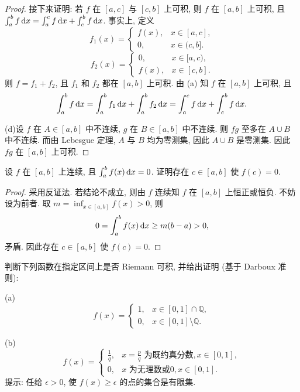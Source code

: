 ﻿\documentclass{article}
\begin{document}
\begin{proof}
  接下来证明: 若 \( f \) 在 \( [a, c] \) 与 \( [c, b] \) 上可积, 则 \( f \) 在 \( [a, b] \) 上可积, 且 \( \int_a^b f \,\mathrm{d} x = \int_a^c f \,\mathrm{d} x + \int_c^b f \,\mathrm{d} x \). 事实上, 定义
  \[ f_1(x) = \begin{cases} f(x), & x \in [a, c], \\ 0, & x \in (c, b]. \end{cases} \]
  \[ f_2(x) = \begin{cases} 0, & x \in [a, c), \\ f(x), & x \in [c, b]. \end{cases} \]
  则 \( f = f_1 + f_2 \), 且 \( f_1 \) 和 \( f_2 \) 都在 \( [a, b] \) 上可积. 由 (a) 知 \( f \) 在 \( [a, b] \) 上可积, 且
  \[ \int_a^b f \,\mathrm{d} x = \int_a^b f_1 \,\mathrm{d} x + \int_a^b f_2 \,\mathrm{d} x = \int_a^c f \,\mathrm{d} x + \int_c^b f \,\mathrm{d} x. \]

  (d)设 \( f \) 在 \( A\in [a,b] \) 中不连续, \( g \) 在 \( B\in [a,b] \) 中不连续. 则 \( fg \) 至多在 \( A\cup B \) 中不连续. 而由 Lebesgue 定理, \( A \) 与 \( B \) 均为零测集, 因此 \( A\cup B \) 是零测集. 因此 \( fg \) 在 \( [a,b] \) 上可积.
\end{proof}



\begin{problem}
设 $f$ 在 $[a, b]$ 上连续, 且 $\int_a^b f(x) \,\mathrm{d} x = 0$. 证明存在 $c \in [a, b]$ 使 $f(c) = 0$.
\end{problem}

\begin{proof}
  采用反证法. 若结论不成立, 则由 \( f \) 连续知 \( f \) 在 \( [a,b] \) 上恒正或恒负. 不妨设为前者. 取 \( m=\inf_{x\in[a,b]}f(x)>0 \), 则
  \[ 0=\int_a^b f(x)\,\mathrm{d} x\ge m(b-a)>0, \]
  矛盾. 因此存在 \( c \in [a, b] \) 使 \( f(c) = 0 \).
\end{proof}



\begin{problem}
判断下列函数在指定区间上是否 Riemann 可积, 并给出证明 (基于 Darboux 准则):

(a) 
\[ 
f(x) = \begin{cases} 1, & x \in [0, 1] \cap \mathbb{Q}, \\ 0, & x \in [0, 1] \setminus \mathbb{Q}. \end{cases} 
\]

(b) 
\[ 
f(x) = \begin{cases} \frac{1}{q}, & x = \frac{p}{q} \text{ 为既约真分数}, x \in [0, 1], \\ 0, & x \text{ 为无理数或} 0, x \in [0, 1]. \end{cases} 
\]
提示: 任给 $\epsilon > 0$, 使 $f(x) \ge \epsilon$ 的点的集合是有限集.
\end{problem}
\end{document}

